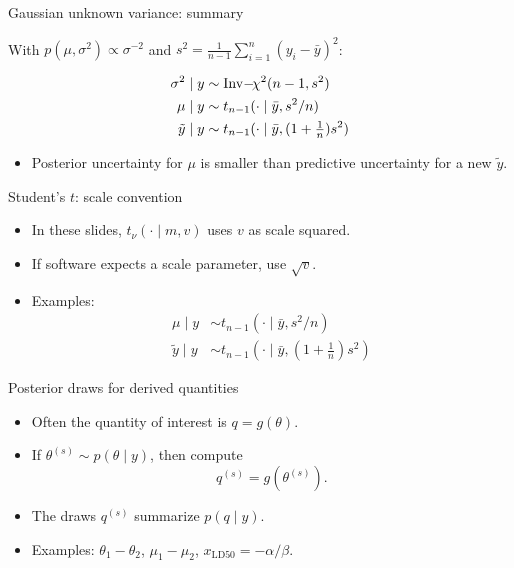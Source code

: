 \documentclass[10pt]{beamer}
\begin{document}
\begin{frame}{Gaussian unknown variance: summary}

  With $p(\mu,\sigma^2)\propto \sigma^{-2}$ and
  $s^2=\frac{1}{n-1}\sum_{i=1}^n(y_i-\bar{y})^2$:

  \begin{align*}
    \sigma^2 \mid y &\sim \operatorname{Inv}\!-\!\chi^2(n-1,s^2)\\
    \mu \mid y &\sim t_{n-1}(\cdot \mid \bar{y},s^2/n)\\
    \tilde{y} \mid y &\sim t_{n-1}(\cdot \mid \bar{y},(1+{\textstyle \frac{1}{n}})s^2)
  \end{align*}

  \begin{itemize}
  \item Posterior uncertainty for $\mu$ is smaller than predictive
    uncertainty for a new $\tilde{y}$.
  \end{itemize}

\end{frame}

\begin{frame}{Student's $t$: scale convention}

  \begin{itemize}
  \item In these slides, $t_\nu(\cdot \mid m,v)$ uses $v$ as scale squared.
  \item If software expects a scale parameter, use $\sqrt{v}$.
  \item Examples:
    \begin{align*}
      \mu \mid y &\sim t_{n-1}(\cdot \mid \bar{y},s^2/n)\\
      \tilde{y} \mid y &\sim t_{n-1}(\cdot \mid \bar{y},(1+{\textstyle \frac{1}{n}})s^2)
    \end{align*}
  \end{itemize}

\end{frame}

\begin{frame}{Posterior draws for derived quantities}

  \begin{itemize}
  \item Often the quantity of interest is $q=g(\theta)$.
  \item If $\theta^{(s)} \sim p(\theta \mid y)$, then compute
    \[
      q^{(s)}=g(\theta^{(s)}).
    \]
  \item The draws $q^{(s)}$ summarize $p(q \mid y)$.
  \item Examples: $\theta_1-\theta_2$, $\mu_1-\mu_2$,
    $x_{\mathrm{LD50}}=-\alpha/\beta$.
  \end{itemize}

\end{frame}
\end{document}
